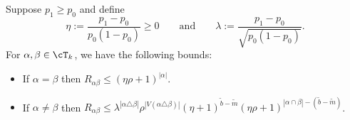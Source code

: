 \documentclass[11pt]{article}
\begin{document}
\begin{lemma}
\label{lem:PDS:estimate}
Suppose $p_1 \ge p_0$ and define
\begin{equation}\label{eq:subg-subst}
\eta := \frac{p_1-p_0}{p_0(1-p_0)} \ge 0 \qquad \text{and} \qquad \lambda := \frac{p_1-p_0}{\sqrt{p_0(1-p_0)}}.
\end{equation}
For $\alpha,\beta \in \cT_k$, we have the following bounds:
\begin{itemize}
    \item If $\alpha = \beta$ then $R_{\alpha\beta} \le (\eta \rho + 1)^{|\alpha|}$.
    \item If $\alpha \ne \beta$ then $R_{\alpha\beta} \le \lambda^{|\alpha \triangle \beta|} \rho^{|V(\alpha \triangle \beta)|} (\eta + 1)^{\tilde{b}-\tilde{m}} (\eta \rho + 1)^{|\alpha \cap \beta| - (\tilde{b} - \tilde{m})}$.
\end{itemize}
\end{lemma}
\end{document}
